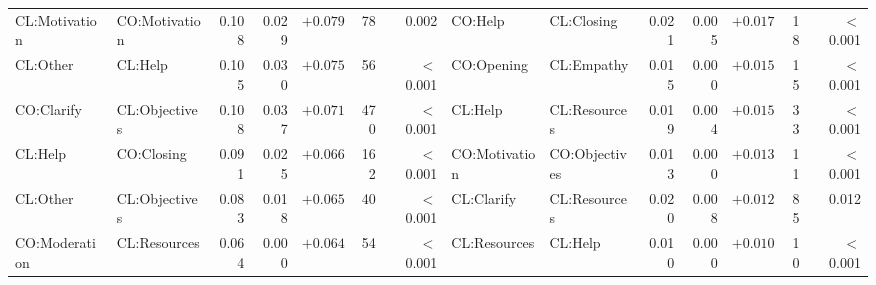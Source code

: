 \begin{tabular}{llrrrrr@{\hspace{1.5em}}llrrrrr}
CL:Motivation & CO:Motivation & 0.108 & 0.029 & $+0.079$ & 78 & 0.002 & CO:Help & CL:Closing & 0.021 & 0.005 & $+0.017$ & 18 & $<$0.001 \\
CL:Other & CL:Help & 0.105 & 0.030 & $+0.075$ & 56 & $<$0.001 & CO:Opening & CL:Empathy & 0.015 & 0.000 & $+0.015$ & 15 & $<$0.001 \\
CO:Clarify & CL:Objectives & 0.108 & 0.037 & $+0.071$ & 470 & $<$0.001 & CL:Help & CL:Resources & 0.019 & 0.004 & $+0.015$ & 33 & $<$0.001 \\
CL:Help & CO:Closing & 0.091 & 0.025 & $+0.066$ & 162 & $<$0.001 & CO:Motivation & CO:Objectives & 0.013 & 0.000 & $+0.013$ & 11 & $<$0.001 \\
CL:Other & CL:Objectives & 0.083 & 0.018 & $+0.065$ & 40 & $<$0.001 & CL:Clarify & CL:Resources & 0.020 & 0.008 & $+0.012$ & 85 & 0.012 \\
CO:Moderation & CL:Resources & 0.064 & 0.000 & $+0.064$ & 54 & $<$0.001 & CL:Resources & CL:Help & 0.010 & 0.000 & $+0.010$ & 10 & $<$0.001 \\
\bottomrule
\end{tabular}
